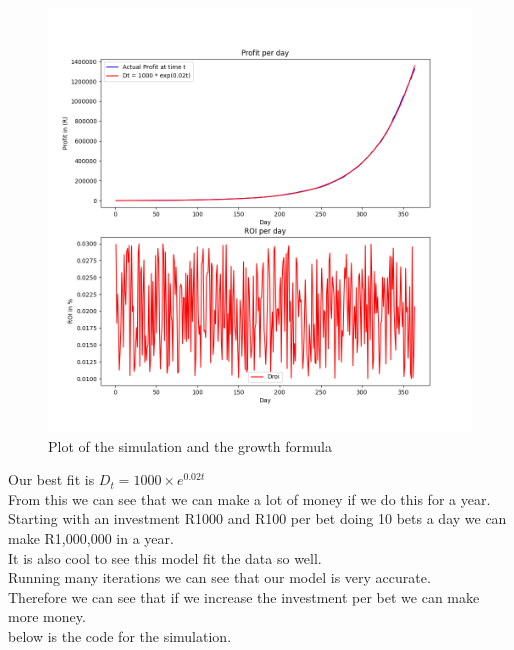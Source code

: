 \begin{figure}[H]
    \centering
    \includegraphics[scale=0.5]{images/fit.png}
    \caption{Plot of the simulation and the growth formula}
    \label{fig:plot2}
\end{figure}

Our best fit is $D_{t} = 1000 \times e^{0.02t}$\\

From this we can see that we can make a lot of money if we do this for a year.\\ 
Starting with an investment R1000 and R100 per bet doing 10 bets a day we can make R1,000,000 in a year.\\

It is also cool to see this model fit the data so well.\\

Running many iterations we can see that our model is very accurate.\\

Therefore we can see that if we increase the investment per bet we can make more money.\\
below is the code for the simulation.

